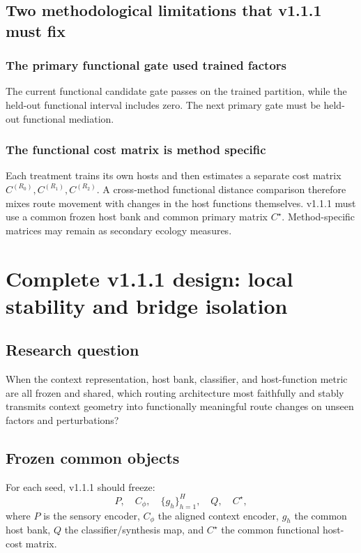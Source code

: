\documentclass[11pt,a4paper]{article}
\begin{document}
\subsection{Two methodological limitations that v1.1.1 must fix}
\subsubsection{The primary functional gate used trained factors}
The current functional candidate gate passes on the trained partition, while the held-out functional interval includes zero. The next primary gate must be held-out functional mediation.

\subsubsection{The functional cost matrix is method specific}
Each treatment trains its own hosts and then estimates a separate cost matrix $C^{(R_0)},C^{(R_1)},C^{(R_2)}$. A cross-method functional distance comparison therefore mixes route movement with changes in the host functions themselves. v1.1.1 must use a common frozen host bank and common primary matrix $C^\star$. Method-specific matrices may remain as secondary ecology measures.

\section{Complete v1.1.1 design: local stability and bridge isolation}
\subsection{Research question}
\begin{plainbox}
When the context representation, host bank, classifier, and host-function metric are all frozen and shared, which routing architecture most faithfully and stably transmits context geometry into functionally meaningful route changes on unseen factors and perturbations?
\end{plainbox}

\subsection{Frozen common objects}
For each seed, v1.1.1 should freeze:
\begin{equation}
P,\quad C_\phi,\quad \{g_h\}_{h=1}^{H},\quad Q,\quad C^\star,
\end{equation}
where $P$ is the sensory encoder, $C_\phi$ the aligned context encoder, $g_h$ the common host bank, $Q$ the classifier/synthesis map, and $C^\star$ the common functional host-cost matrix.
\end{document}
